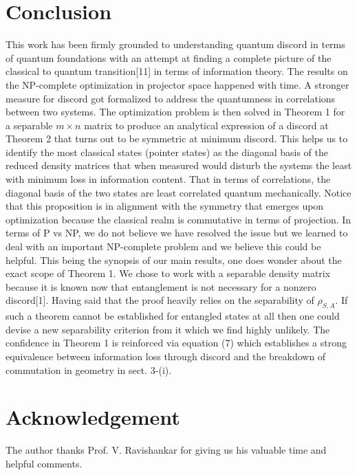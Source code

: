 \documentclass[8pt]{article}
\begin{document}
\section{Conclusion} 
This work has been firmly grounded to understanding quantum discord in terms of quantum foundations with an attempt at finding a complete picture of the classical to quantum transition[11] in terms of information theory. The results on the NP-complete optimization in projector space happened with time. A stronger measure for discord got formalized to address the quantumness in correlations between two systems. The optimization problem is then solved in Theorem 1 for a separable $m \times n$ matrix to produce an analytical expression of a discord at Theorem 2 that turns out to be symmetric at minimum discord. This helps us to identify the most classical states (pointer states) as the diagonal basis of the reduced density matrices that when measured would disturb the systems the least with minimum loss in information content. That in terms of correlations, the diagonal basis of the two states are least correlated quantum mechanically. Notice that this proposition is in alignment with the symmetry that emerges upon optimization because the classical realm is commutative in terms of projection. In terms of P vs NP, we do not believe we have resolved the issue but we learned to deal with an important NP-complete problem and we believe this could be helpful. This being the synopsis of our main results, one does wonder about the exact scope of Theorem 1. We chose to work with a separable density matrix because it is known now that entanglement is not necessary for a nonzero discord[1]. Having said that the proof heavily relies on the separability of $\rho_{S,A}$. If such a theorem cannot be established for entangled states at all then one could devise a new separability criterion from it which we find highly unlikely. The confidence in Theorem 1 is reinforced via equation (7) which establishes a strong equivalence between information loss through discord and the breakdown of commutation in geometry in sect. 3-(i).
\section{ Acknowledgement} 
The author thanks Prof. V. Ravishankar for giving us his valuable time and helpful comments.
\end{document}
